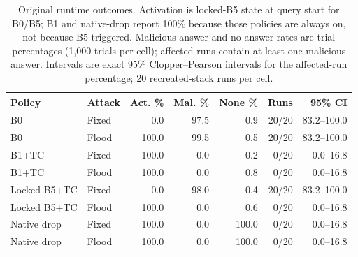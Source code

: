 \begin{table}[t]
\centering
\caption{Original runtime outcomes. Activation is locked-B5 state at query start for B0/B5; B1 and native-drop report 100\% because those policies are always on, not because B5 triggered. Malicious-answer and no-answer rates are trial percentages (1,000 trials per cell); affected runs contain at least one malicious answer. Intervals are exact 95\% Clopper--Pearson intervals for the affected-run percentage; 20 recreated-stack runs per cell.}
\label{tab:rq4-runtime}
\begingroup
\fontsize{9}{10.8}\selectfont
\setlength{\tabcolsep}{3pt}
\begin{tabular}{llrrrrr}
\hline
Policy & Attack & Act. \% & Mal. \% & None \% & Runs & 95\% CI \\
\hline
B0 & Fixed & 0.0 & 97.5 & 0.9 & 20/20 & 83.2--100.0 \\
B0 & Flood & 100.0 & 99.5 & 0.5 & 20/20 & 83.2--100.0 \\
B1+TC & Fixed & 100.0 & 0.0 & 0.2 & 0/20 & 0.0--16.8 \\
B1+TC & Flood & 100.0 & 0.0 & 0.8 & 0/20 & 0.0--16.8 \\
Locked B5+TC & Fixed & 0.0 & 98.0 & 0.4 & 20/20 & 83.2--100.0 \\
Locked B5+TC & Flood & 100.0 & 0.0 & 0.6 & 0/20 & 0.0--16.8 \\
Native drop & Fixed & 100.0 & 0.0 & 100.0 & 0/20 & 0.0--16.8 \\
Native drop & Flood & 100.0 & 0.0 & 100.0 & 0/20 & 0.0--16.8 \\
\hline
\end{tabular}
\endgroup
\end{table}
